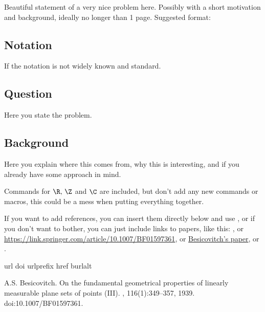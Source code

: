 
Beautiful statement of a very nice problem here. Possibly with a short motivation and background, ideally no longer than 1 page. Suggested format:
\subsection*{Notation} If the notation is not widely known and standard.

\subsection*{Question} Here you state the problem.

\subsection*{Background} Here you explain where this comes from, why this is interesting, and if you already have some approach in mind.

\vspace{.5em}
Commands for $\R,\, \Z$ and $\C$ are included, but don't add any new commands or macros, this could be a mess when putting everything together.

If you want to add references, you can insert them directly below and use \cite{besicovitch1939on}, or if you don't want to bother, you can just include links to papers, like this: , or \url{https://link.springer.com/article/10.1007/BF01597361}, or \href{https://link.springer.com/article/10.1007/BF01597361}{Besicovitch's paper}, or .

\begin{thebibliography}
	\expandafter\ifx\csname url\endcsname\relax
	\def\url#1{\texttt{#1}}\fi
	\expandafter\ifx\csname doi\endcsname\relax
	\def\doi#1{\burlalt{doi:#1}{http://dx.doi.org/#1}}\fi
	\expandafter\ifx\csname urlprefix\endcsname\relax\def\urlprefix{URL }\fi
	\expandafter\ifx\csname href\endcsname\relax
	\def\href#1#2{#2}\fi
	\expandafter\ifx\csname burlalt\endcsname\relax
	\def\burlalt#1#2{\href{#2}{#1}}\fi
	
A.S. Besicovitch.
\newblock On the fundamental geometrical properties of linearly measurable
plane sets of points {(III)}.
, 116(1):349--357, 1939.
\newblock \doi{10.1007/BF01597361}.
\end{thebibliography}

\hrulefill
\vspace{1em}